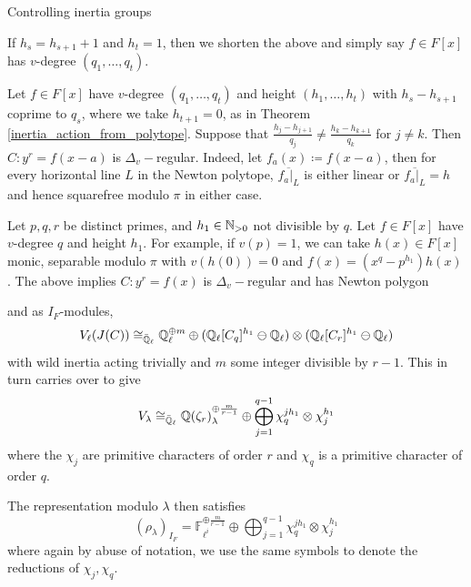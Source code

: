 \documentclass[11pt,a4paper]{article}
\newcommand{\Fli}{\mathbb{F}_{\ell^i}}
\newcommand{\Dv}{\Delta_v}
\newcommand{\Qr}{{\QQ(\zeta_r)}}
\begin{document}
\begin{section}{Controlling inertia groups}
\begin{definition}
If $h_{s} =h_{s+1} +1 $ and $ h_t =1$, then we shorten the above and simply say $f \in F[x]$ has $v$-degree $(q_1, \ldots, q_t)$.
\end{definition}

\begin{remark} 
Let $f\in F[x]$ have $v$-degree $(q_1, \ldots, q_t)$ and height $(h_1, \ldots, h_t)$ with $h_s-h_{s+1}$  coprime to $q_s$, where we take $h_{t+1}=0$, as in Theorem \ref{inertia_action_from_polytope}. Suppose that $\frac{h_j-h_{j+1}}{q_j} \neq \frac{h_k-h_{k+1}}{q_k}$ for $j \neq k$.
Then $C\colon y^r=f(x-a)$ is $\Dv-$regular. Indeed, let $f_a(x)\coloneqq f(x-a)$, then for every horizontal line $L$ in the Newton polytope, $\overline{f_a|_L}$ is either linear or $\overline{f_a|_L} = h$ and hence squarefree modulo $\pi$ in either case. 
\end{remark}



\begin{example}
\label{example_one_prime}
Let $p,q,r$ be distinct primes, and $h_1 \in \mathbb{N}_{>0}$ not divisible by $q$.
Let $f \in F[x]$ have $v$-degree $q$ and height $h_1$.
For example, if $v(p)=1$, we can take $h(x) \in F[x]$ monic, separable modulo $\pi$ with $v\left( h(0) \right) =0$ and  $f(x) = (x^q-p^{h_1})h(x)$.
The above implies $C\colon y^r=f(x)$ is $\Dv-$regular and has Newton polygon
\begin{center}
\end{center}
and as $I_F$-modules, \[V_\ell(J(C)) \cong_{\Bar{\mathbb{Q}}_\ell}\mathbb{Q}_\ell^{\oplus m} \oplus (\mathbb{Q}_\ell[C_{q}]^{h_1} \ominus \mathbb{Q}_\ell )\otimes (\mathbb{Q}_\ell[C_{r}]^{h_1}  \ominus \mathbb{Q}_\ell)\]
with wild inertia acting trivially and $m$ some integer divisible by $r-1$. This in turn carries over to give
\[V_\lambda \cong_{\Bar{\QQ}_\ell} \Qr_{\lambda}^{\oplus \frac{m}{r-1}} \oplus \bigoplus_{j=1}^{q-1} \chi_q^{jh_1} \otimes \chi_j^{h_1}\]
where the $\chi_j$ are primitive characters of order $r$ and $\chi_q$ is a primitive character of order $q$.

The representation modulo $\lambda$ then satisfies
\[ (\rho_\lambda)_{I_F} =  \Fli^{\oplus \frac{m}{r-1}} \oplus \bigoplus_{j=1}^{q-1} \chi_q^{jh_1} \otimes \chi_j^{h_1}
\]
where again by abuse of notation, we use the same symbols to denote the reductions of $ \chi_j, \chi_{q}$.


\end{example}
\end{section}
\end{document}
